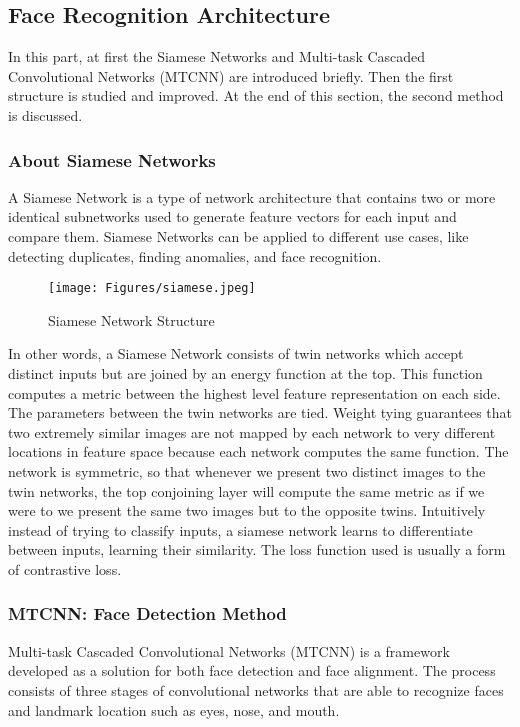 \subsection*{Face Recognition Architecture}
In this part, at first the Siamese Networks and Multi-task Cascaded Convolutional Networks (MTCNN) are introduced briefly. Then the first structure is studied and improved. At the end of this section, the second method is discussed.

\subsubsection*{About Siamese Networks}
A Siamese Network is a type of network architecture that contains two or more identical subnetworks used to generate feature vectors for each input and compare them. Siamese Networks can be applied to different use cases, like detecting duplicates, finding anomalies, and face recognition.

\begin{figure}[h]
	\centering
	\texttt{[image: Figures/siamese.jpeg]}
	\caption{Siamese Network Structure}
	\label{fig:f}
\end{figure}

In other words, a Siamese Network consists of twin networks which accept distinct inputs but are joined by an energy function at the top. This function computes a metric between the highest level feature representation on each side. The parameters between the twin networks are tied. Weight tying guarantees that two extremely similar images are not mapped by each network to very different locations in feature space because each network computes the same function. The network is symmetric, so that whenever we present two distinct images to the twin networks, the top conjoining layer will compute the same metric as if we were to we present the same two images but to the opposite twins. Intuitively instead of trying to classify inputs, a siamese network learns to differentiate between inputs, learning their similarity. The loss function used is usually a form of contrastive loss.

\subsubsection*{MTCNN: Face Detection Method}
Multi-task Cascaded Convolutional Networks (MTCNN) is a framework developed as a solution for both face detection and face alignment. The process consists of three stages of convolutional networks that are able to recognize faces and landmark location such as eyes, nose, and mouth.


